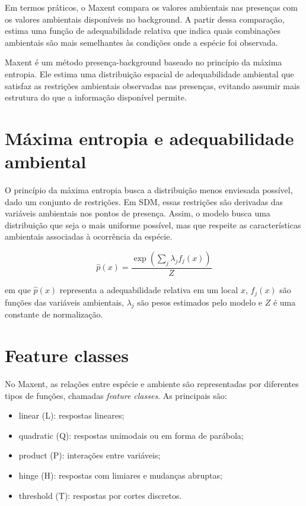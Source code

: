 \documentclass{ueap-sdm}
\begin{document}
Em termos práticos, o Maxent compara os valores ambientais nas presenças com os valores ambientais disponíveis no background. A partir dessa comparação, estima uma função de adequabilidade relativa que indica quais combinações ambientais são mais semelhantes às condições onde a espécie foi observada.

\begin{conceito}[title={\faBook\quad Maxent em SDM}]
	Maxent é um método presença-background baseado no princípio da máxima entropia. Ele estima uma distribuição espacial de adequabilidade ambiental que satisfaz as restrições ambientais observadas nas presenças, evitando assumir mais estrutura do que a informação disponível permite.
\end{conceito}

\section{Máxima entropia e adequabilidade ambiental}

O princípio da máxima entropia busca a distribuição menos enviesada possível, dado um conjunto de restrições. Em SDM, essas restrições são derivadas das variáveis ambientais nos pontos de presença. Assim, o modelo busca uma distribuição que seja o mais uniforme possível, mas que respeite as características ambientais associadas à ocorrência da espécie.

\begin{equationbox}
	\[
	\hat{p}(x) =
	\frac{\exp\left(\sum_j \lambda_j f_j(x)\right)}
	{Z}
	\]
\end{equationbox}

em que \(\hat{p}(x)\) representa a adequabilidade relativa em um local \(x\), \(f_j(x)\) são funções das variáveis ambientais, \(\lambda_j\) são pesos estimados pelo modelo e \(Z\) é uma constante de normalização.

\section{Feature classes}

No Maxent, as relações entre espécie e ambiente são representadas por diferentes tipos de funções, chamadas \textit{feature classes}. As principais são:

\begin{itemize}
	\item linear (L): respostas lineares;
	\item quadratic (Q): respostas unimodais ou em forma de parábola;
	\item product (P): interações entre variáveis;
	\item hinge (H): respostas com limiares e mudanças abruptas;
	\item threshold (T): respostas por cortes discretos.
\end{itemize}
\end{document}
